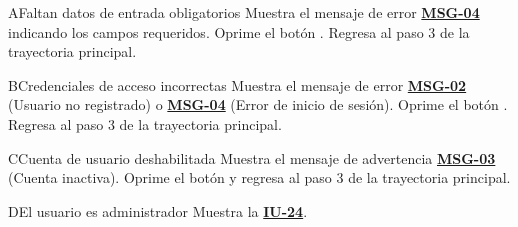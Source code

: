 \begin{UCtrayectoriaA}{A}{Faltan datos de entrada obligatorios}
	\UCpaso Muestra el mensaje de error \hyperlink{mMSG04}{\bf MSG-04} indicando los campos requeridos.
	\UCpaso[\UCactor] Oprime el botón .
	\UCpaso Regresa al paso 3 de la trayectoria principal.
\end{UCtrayectoriaA}

\begin{UCtrayectoriaA}{B}{Credenciales de acceso incorrectas}
	\UCpaso Muestra el mensaje de error \hyperlink{mMSG02}{\bf MSG-02} (Usuario no registrado) o \hyperlink{mMSG04}{\bf MSG-04} (Error de inicio de sesión).
	\UCpaso[\UCactor] Oprime el botón .
	\UCpaso Regresa al paso 3 de la trayectoria principal.
\end{UCtrayectoriaA}

\begin{UCtrayectoriaA}{C}{Cuenta de usuario deshabilitada}
	\UCpaso Muestra el mensaje de advertencia \hyperlink{mMSG03}{\bf MSG-03} (Cuenta inactiva).
	\UCpaso[\UCactor] Oprime el botón  y regresa al paso 3 de la trayectoria principal.
\end{UCtrayectoriaA}

\begin{UCtrayectoriaA}{D}{El usuario es administrador}
	\UCpaso Muestra la \hyperlink{IU24}{\bf IU-24}.
\end{UCtrayectoriaA}
